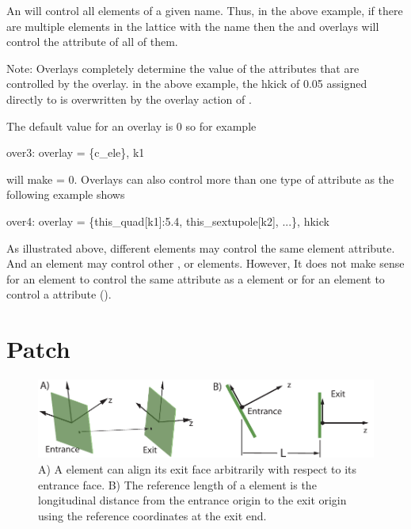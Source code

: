 {An  will control all elements of a given name. Thus, in
the above example, if there are multiple elements in the lattice
with the name  then the  and  overlays
will control the  attribute of all of them.

Note: Overlays completely determine the value of the attributes that
are controlled by the overlay. in the above example, the hkick of 0.05
assigned directly to  is overwritten by the overlay action
of .

\noindent The default value for an overlay is 0 so for example
\begin{example}
  over3: overlay = \{c_ele\}, k1
\end{example}
will make  = 0. Overlays can also control more than one
type of attribute as the following example shows
\begin{example}
  over4: overlay = \{this_quad[k1]:5.4, this_sextupole[k2], ...\}, hkick
\end{example}

As illustrated above, different  elements may control the
same element attribute. And an  element may control other
,  or  elements. However, It does not
make sense for an  element to control the same attribute
as a  element or for an  element to control a
 attribute ().

\section{Patch}
\label{s:patch}

\begin{figure}[tb]
  \centering
  \includegraphics[width=5in]{patch.pdf}
  \caption[Patch Element.]
{A) A  element can align its exit face arbitrarily with
respect to its entrance face. B) The reference length of a 
element is the longitudinal distance from the entrance origin to the
exit origin using the reference coordinates at the exit end.}
  \label{f:patch}
\end{figure}

}
